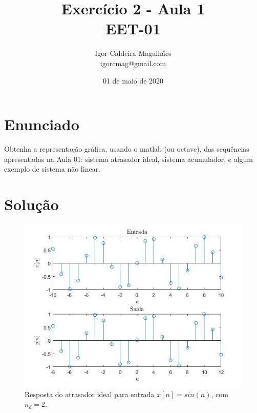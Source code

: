 \documentclass[a4paper, 12pt]{article}
\title{Exercício 2 - Aula 1 \\ EET-01}
\author{
  Igor Caldeira Magalhães\\igorcmag@gmail.com
}
\date{01 de maio de 2020}
\begin{document}
\maketitle
\section{Enunciado}

Obtenha a representação gráfica, usando o matlab (ou octave), das sequências apresentadas na Aula 01: sistema atrasador ideal, sistema acumulador, e algum exemplo de sistema não linear.

\section{Solução}



\begin{figure}[H]
	\centering
	\includegraphics[scale=0.7]{img1.jpg} 
	\caption{Resposta do atrasador ideal para entrada $x[n] = sin(n)$, com $n_d = 2$.}
	\label{fig:1a}
\end{figure}
\end{document}
